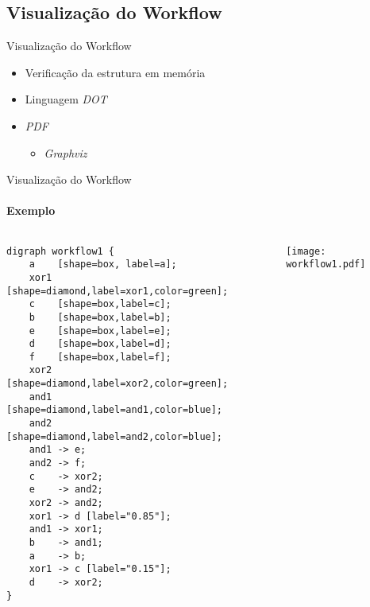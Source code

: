 \documentclass[xcolor=x11names,compress]{beamer}
\renewcommand{\(}{\begin{columns}}
\renewcommand{\)}{\end{columns}}
\newcommand{\<}[1]{\begin{column}{#1}}
\renewcommand{\>}{\end{column}}
\begin{document}
    \subsection{Visualização do Workflow}
        \begin{frame}{Visualização do Workflow}
            \begin{itemize}
                \item<+-> Verificação da estrutura em memória
                \item<+-> Linguagem \emph{DOT}
                \item<+-> \emph{PDF}
                    \begin{itemize}
                        \item \emph{Graphviz}
                    \end{itemize}
            \end{itemize}
        \end{frame}

\begin{frame}[fragile]{Visualização do Workflow}
\framesubtitle{Exemplo}
    \begin{columns}[c]
        \begin{column}[l]{5cm}
        \begin{lstlisting}[basicstyle=\tiny]
digraph workflow1 {
    a    [shape=box, label=a];
    xor1 [shape=diamond,label=xor1,color=green];
    c    [shape=box,label=c];
    b    [shape=box,label=b];
    e    [shape=box,label=e];
    d    [shape=box,label=d];
    f    [shape=box,label=f];
    xor2 [shape=diamond,label=xor2,color=green];
    and1 [shape=diamond,label=and1,color=blue];
    and2 [shape=diamond,label=and2,color=blue];
    and1 -> e;
    and2 -> f;
    c    -> xor2;
    e    -> and2;
    xor2 -> and2;
    xor1 -> d [label="0.85"];
    and1 -> xor1;
    b    -> and1;
    a    -> b;
    xor1 -> c [label="0.15"];
    d    -> xor2;
}
        \end{lstlisting}
        \end{column}

        \begin{column}{5cm}
            \hfill
            \texttt{[image: workflow1.pdf]}
        \end{column}
    \end{columns}
\end{frame}
\end{document}
